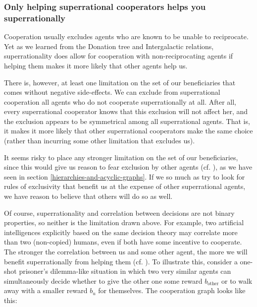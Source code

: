 \hypertarget{only-helping-superrational-cooperators-helps-you-superrationally}{\subsubsection{Only
helping superrational cooperators helps you
superrationally}\label{only-helping-superrational-cooperators-helps-you-superrationally}}

Cooperation usually excludes agents who are known to be unable to
reciprocate. Yet as we learned from the Donation tree and Intergalactic
relations, superrationality does allow for cooperation with
non-reciprocating agents if helping them makes it more likely that other
agents help us.

There is, however, at least one limitation on the set of our
beneficiaries that comes without negative side-effects. We can exclude
from superrational cooperation all agents who do not cooperate
superrationally at all. After all, every superrational cooperator knows
that this exclusion will not affect her, and the exclusion appears to be
symmetrical among all superrational agents. That is, it makes it more
likely that other superrational cooperators make the same choice (rather
than incurring some other limitation that excludes us).

It seems risky to place any stronger limitation on the set of our
beneficiaries, since this would give us reason to fear exclusion by
other agents (cf. \cite{Drescher2006-ky}), as we have
seen in section
\ref{hierarchies-and-acyclic-graphs}. If we so much as try to look for rules of
exclusivity that benefit us at the expense of other superrational
agents, we have reason to believe that others will do so as well.

Of course, superrationality and correlation between decisions are not
binary properties, so neither is the limitation drawn above. For
example, two artificial intelligences explicitly based on the same
decision theory may correlate more than two (non-copied) humans, even if
both have some incentive to cooperate. The stronger the correlation
between us and some other agent, the more we will benefit
superrationally from helping them (cf.
\cite{Drescher2006-ky}). To illustrate this, consider a
one-shot prisoner's dilemma-like situation in which two very similar
agents can simultaneously decide whether to give the other one some
reward \(b_{\text{other}}\) or to walk away with a smaller reward
\(b_{u}\) for themselves. The cooperation graph looks like this:

